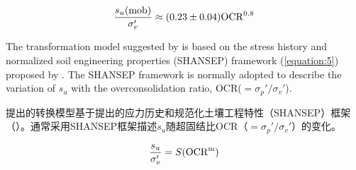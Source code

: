 \begin{align}
    \dfrac{s_u(\rm{mob})}{\sigma_v'}\approx{}(0.23\pm{}0.04)\rm{OCR}^{0.8}
    \label{equation:4}
\end{align}

\begin{paracol}{2}
    
    The transformation model suggested by \citet{Jamiolkowski198557} is based on the stress history and normalized soil engineering properties (SHANSEP) framework (\autoref{equation:5}) proposed by \citet{Ladd1974763}. The SHANSEP framework is normally adopted to describe the variation of $s_u$ with the overconsolidation ratio, OCR($=\sigma_p'/\sigma_v'$).

    \switchcolumn

    \citet{Jamiolkowski198557}提出的转换模型基于\citet{Ladd1974763}提出的应力历史和规范化土壤工程特性（SHANSEP）框架（）。通常采用SHANSEP框架描述$s_u$随超固结比OCR（$=\sigma_p'/\sigma_v'$）的变化。

\end{paracol}

\begin{align}
    \dfrac{s_u}{\sigma_v'}=S(\rm{OCR}^m)
    \label{equation:5}
\end{align}

